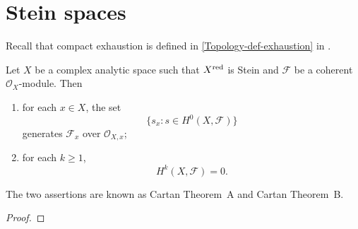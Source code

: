 \section{Stein spaces}

Recall that compact exhaustion is defined in \cref{Topology-def-exhaustion} in .
\begin{thm}
    Let $X$ be a complex analytic space such that $X^{\operatorname{red}}$ is Stein and $\mathcal{F}$ be a coherent $\mathcal{O}_X$-module. Then
    \begin{enumerate}
        \item for each $x\in X$, the set 
            \[
                \{s_x:s\in H^0(X,\mathcal{F})\}
            \]
            generates $\mathcal{F}_x$ over $\mathcal{O}_{X,x}$;
        \item for each $k\geq 1$,
            \[
                H^k(X,\mathcal{F})=0.
            \]
    \end{enumerate}
\end{thm}
The two assertions are known as Cartan Theorem~A and Cartan Theorem~B.


\begin{proof}
    
\end{proof}

\cite{stacks-project}

\printbibliography
